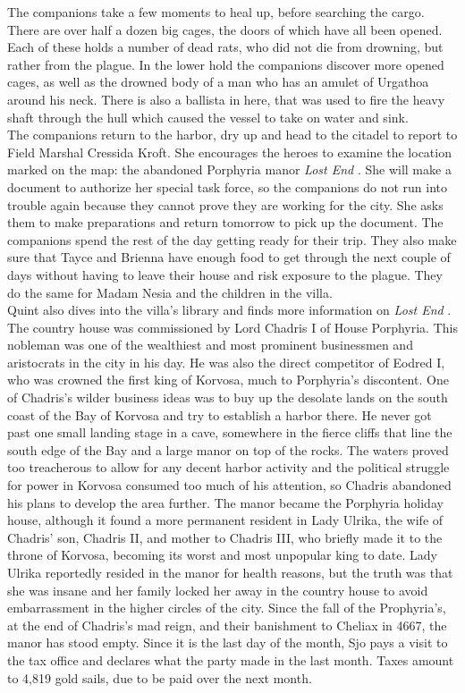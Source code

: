 The companions take a few moments to heal up, before searching the cargo. There are over half a dozen big cages, the doors of which have all been opened. Each of these holds a number of dead rats, who did not die from drowning, but rather from the plague. In the lower hold the companions discover more opened cages, as well as the drowned body of a man who has an amulet of Urgathoa around his neck. There is also a ballista in here, that was used to fire the heavy shaft through the hull which caused the vessel to take on water and sink.\\

The companions return to the harbor, dry up and head to the citadel to report to Field Marshal Cressida Kroft. She encourages the heroes to examine the location marked on the map: the abandoned Porphyria manor {\itshape Lost End} . She will make a document to authorize her special task force, so the companions do not run into trouble again because they cannot prove they are working for the city. She asks them to make preparations and return tomorrow to pick up the document. The companions spend the rest of the day getting ready for their trip. They also make sure that Tayce and Brienna have enough food to get through the next couple of days without having to leave their house and risk exposure to the plague. They do the same for Madam Nesia and the children in the villa.\\

Quint also dives into the villa's library and finds more information on {\itshape Lost End} . The country house was commissioned by Lord Chadris I of House Porphyria. This nobleman was one of the wealthiest and most prominent businessmen and aristocrats in the city in his day. He was also the direct competitor of Eodred I, who was crowned the first king of Korvosa, much to Porphyria's discontent. One of Chadris's wilder business ideas was to buy up the desolate lands on the south coast of the Bay of Korvosa and try to establish a harbor there. He never got past one small landing stage in a cave, somewhere in the fierce cliffs that line the south edge of the Bay and a large manor on top of the rocks. The waters proved too treacherous to allow for any decent harbor activity and the political struggle for power in Korvosa consumed too much of his attention, so Chadris abandoned his plans to develop the area further. The manor became the Porphyria holiday house, although it found a more permanent resident in Lady Ulrika, the wife of Chadris' son, Chadris II, and mother to Chadris III, who briefly made it to the throne of Korvosa, becoming its worst and most unpopular king to date. Lady Ulrika reportedly resided in the manor for health reasons, but the truth was that she was insane and her family locked her away in the country house to avoid embarrassment in the higher circles of the city. Since the fall of the Prophyria's, at the end of Chadris's mad reign, and their banishment to Cheliax in 4667, the manor has stood empty. Since it is the last day of the month, Sjo pays a visit to the tax office and declares what the party made in the last month. Taxes amount to 4,819 gold sails, due to be paid over the next month.\\

